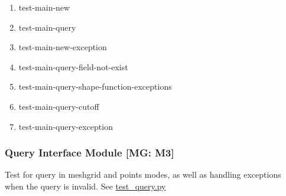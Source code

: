 \documentclass[12pt, titlepage]{article}
\begin{document}
\begin{enumerate}
  \item test-main-new
  \item test-main-query
  \item test-main-new-exception
  \item test-main-query-field-not-exist
  \item test-main-query-shape-function-exceptions
  \item test-main-query-cutoff
  \item test-main-query-exception


					
					
					


					

					
					
					



    
\end{enumerate}

\subsubsection{Query Interface Module [MG: M3]} \label{UT:Query}
Test for query in meshgrid and points modes, as well as handling exceptions when the query is invalid. See \href{https://github.com/omltcat/turbulent-flow/blob/main/test/test_query.py}{test\_query.py}
\end{document}
